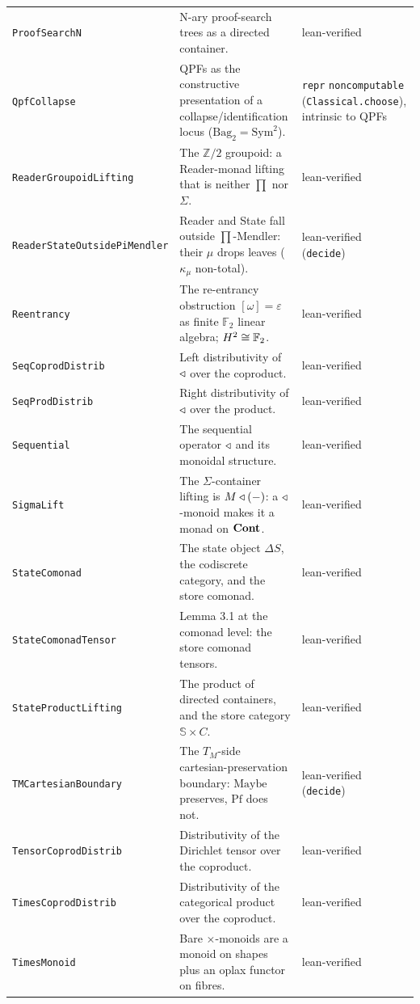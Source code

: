 \begin{longtable}{@{}p{}p{}p{}@{}}
\texttt{ProofSearchN} & N-ary proof-search trees as a directed container. & lean-verified \\
\texttt{QpfCollapse} & QPFs as the constructive presentation of a collapse/identification locus ($\mathrm{Bag}_2=\mathrm{Sym}^2$). & \texttt{repr} \texttt{noncomputable} (\texttt{Classical.choose}), intrinsic to QPFs \\
\texttt{ReaderGroupoidLifting} & The $\mathbb{Z}/2$ groupoid: a Reader-monad lifting that is neither $\prod$ nor $\Sigma$. & lean-verified \\
\texttt{ReaderStateOutsidePiMendler} & Reader and State fall outside $\prod$-Mendler: their $\mu$ drops leaves ($\kappa_\mu$ non-total). & lean-verified (\texttt{decide}) \\
\texttt{Reentrancy} & The re-entrancy obstruction $[\omega]=\varepsilon$ as finite $\mathbb{F}_2$ linear algebra; $H^2\cong\mathbb{F}_2$. & lean-verified \\
\texttt{SeqCoprodDistrib} & Left distributivity of $\triangleleft$ over the coproduct. & lean-verified \\
\texttt{SeqProdDistrib} & Right distributivity of $\triangleleft$ over the product. & lean-verified \\
\texttt{Sequential} & The sequential operator $\triangleleft$ and its monoidal structure. & lean-verified \\
\texttt{SigmaLift} & The $\Sigma$-container lifting is $M\triangleleft(-)$: a $\triangleleft$-monoid makes it a monad on $\mathbf{Cont}$. & lean-verified \\
\texttt{StateComonad} & The state object $\Delta S$, the codiscrete category, and the store comonad. & lean-verified \\
\texttt{StateComonadTensor} & Lemma 3.1 at the comonad level: the store comonad tensors. & lean-verified \\
\texttt{StateProductLifting} & The product of directed containers, and the store category $\mathbb{S}\times C$. & lean-verified \\
\texttt{TMCartesianBoundary} & The $T_M$-side cartesian-preservation boundary: $\mathrm{Maybe}$ preserves, $\mathrm{Pf}$ does not. & lean-verified (\texttt{decide}) \\
\texttt{TensorCoprodDistrib} & Distributivity of the Dirichlet tensor over the coproduct. & lean-verified \\
\texttt{TimesCoprodDistrib} & Distributivity of the categorical product over the coproduct. & lean-verified \\
\texttt{TimesMonoid} & Bare $\times$-monoids are a monoid on shapes plus an oplax functor on fibres. & lean-verified \\

\end{longtable}
